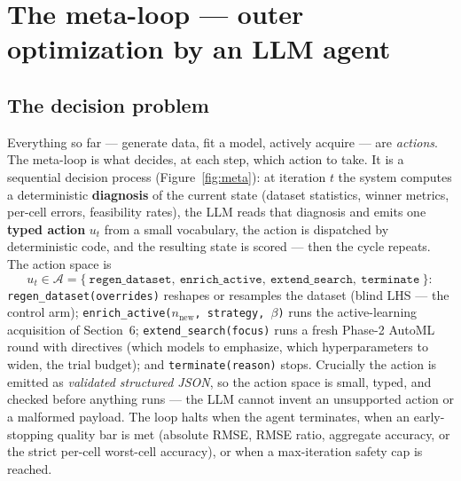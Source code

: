 \documentclass[11pt]{article}
\begin{document}
\section{The meta-loop --- outer optimization by an LLM agent}
\label{sec:meta}

\subsection{The decision problem}
Everything so far --- generate data, fit a model, actively acquire --- are \emph{actions}. The
meta-loop is what decides, at each step, which action to take. It is a sequential decision process
(Figure~\ref{fig:meta}): at iteration $t$ the system computes a deterministic \textbf{diagnosis} of
the current state (dataset statistics, winner metrics, per-cell errors, feasibility rates), the LLM
reads that diagnosis and emits one \textbf{typed action} $u_t$ from a small vocabulary, the action
is dispatched by deterministic code, and the resulting state is scored --- then the cycle repeats.
The action space is
\begin{equation}
u_t\in\mathcal{A}=\{\ \texttt{regen\_dataset},\ \texttt{enrich\_active},\ \texttt{extend\_search},\ \texttt{terminate}\ \}:
\end{equation}
\texttt{regen\_dataset(overrides)} reshapes or resamples the dataset (blind LHS --- the control
arm); \texttt{enrich\_active($n_{\text{new}}$, strategy, $\beta$)} runs the active-learning
acquisition of Section~6; \texttt{extend\_search(focus)} runs a fresh Phase-2 AutoML round with
directives (which models to emphasize, which hyperparameters to widen, the trial budget); and
\texttt{terminate(reason)} stops. Crucially the action is emitted as \emph{validated structured
JSON}, so the action space is small, typed, and checked before anything runs --- the LLM cannot
invent an unsupported action or a malformed payload. The loop halts when the agent terminates, when
an early-stopping quality bar is met (absolute RMSE, RMSE ratio, aggregate accuracy, or the strict
per-cell worst-cell accuracy), or when a max-iteration safety cap is reached.
\end{document}
